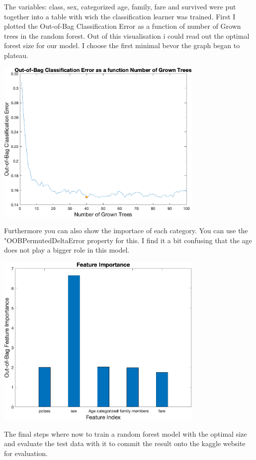 \documentclass[
   10.5pt,
   invert-title=true,
   titlepage=false,
   titleimage-ratio=13,
   class=article
]{bfhpub}				%
\begin{document}
The variables: class, sex, categorized age, family, fare and survived were put together into a table with wich the classification learner was trained.
First I plotted the Out-of-Bag Classification Error as a function of number of Grown trees in the random forest. Out of this visualisation i could read out the optimal forest size for our model. I choose the first minimal bevor the graph began to plateau.
\begin{center}
	\includegraphics[width=100mm]{oob_error_plot_size40}
\end{center}
Furthermore you can also show the importace of each category. You can use the "OOBPermutedDeltaError property for this. I find it a bit confusing that the age does not play a bigger role in this model.
\begin{center}
	\includegraphics[width=100mm]{feature_importance_plot_size40}
\end{center}
The final steps where now to train a random forest model with the optimal size and evaluate the test data with it to commit the result onto the kaggle website for evaluation.
\end{document}
